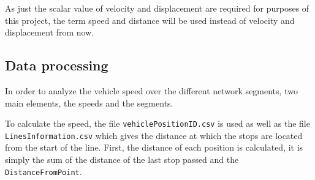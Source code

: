\documentclass{article}
\begin{document}
As just the scalar value of velocity and displacement are required for purposes of this project, the term speed and distance will be used instead of velocity and displacement from now.



\subsection{Data processing}

In order to analyze the vehicle speed over the different network segments, two main elements, the speeds and the segments.

To calculate the speed, the file \texttt{vehiclePositionID.csv} is used as well as the file \texttt{LinesInformation.csv} which gives the distance at which the stops are located from the start of the line. First, the distance of each position is calculated, it is simply the sum of the distance of the last stop passed and the \texttt{DistanceFromPoint}.
\end{document}
